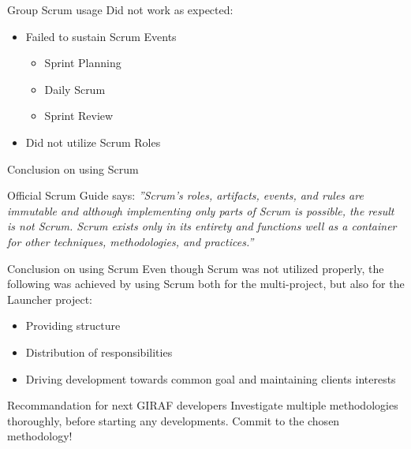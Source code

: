 \begin{frame}{Group Scrum usage}
  Did not work as expected:
  \pause
  \begin{itemize}
    	\item Failed to sustain Scrum Events
    			\begin{itemize}
    			\item Sprint Planning
    			\item Daily Scrum
    			\item Sprint Review
    			\end{itemize}
    			\pause
    \item Did not utilize Scrum Roles
  \end{itemize}
\end{frame}

\begin{frame}{Conclusion on using Scrum}
  \begin{block}{Official Scrum Guide says:}
  \textit{''Scrum’s roles, artifacts, events, and rules are immutable and although implementing only parts of Scrum is possible, the result is not Scrum. 
  Scrum exists only in its entirety and functions well as a container for other techniques, methodologies, and practices.''}
  \end{block}
\end{frame}

\begin{frame}{Conclusion on using Scrum}
  Even though Scrum was not utilized properly, the following was achieved by using Scrum both for the multi-project, but also for the Launcher project:
  \pause
  \begin{itemize}
    \item Providing structure
    \pause
    \item Distribution of responsibilities
    \pause
    \item Driving development towards common goal and maintaining clients interests
  \end{itemize}
  \pause
  \linespace
  \begin{block}{Recommandation for next GIRAF developers}
  Investigate multiple methodologies thoroughly, before starting any developments.
  Commit to the chosen methodology!
  \end{block}
\end{frame}

